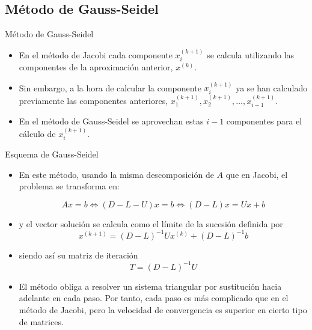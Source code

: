\documentclass[10pt]{beamer}
\begin{document}
  \subsection{M\'etodo de Gauss-Seidel}
  \begin{frame}{M\'etodo de Gauss-Seidel}
  \begin{itemize}
    \item<1-> En el m\'etodo de Jacobi cada componente $x_i^{(k+1)}$ se calcula utilizando las componentes de la aproximaci\'on anterior, $x^{(k)}$.
 \item<2-> Sin embargo, a la hora de calcular la componente $x_i^{(k+1)}$ ya se han calculado previamente las componentes anteriores, $x_1^{(k+1)}, x_2^{(k+1)},\ldots, x_{i-1}^{(k+1)}$.
 \item<3-> En el m\'etodo de Gauss-Seidel se aprovechan estas $i-1$ componentes para el c\'alculo de $x_i^{(k+1)}$.
 \end{itemize}
  \end{frame}
  \begin{frame}{Esquema de Gauss-Seidel}
  \begin{itemize}
    \item<1-> En este m\'etodo, usando la misma descomposici\'on de $A$ que en Jacobi, el problema se transforma en:

    $$
    Ax = b \Leftrightarrow (D - L -U)x = b \Leftrightarrow (D - L) x =Ux + b
    $$
    
    \item<2->y el vector soluci\'on se calcula como el l\'imite de la sucesi\'on definida por    
    $$
    x^{(k+1)} = (D-L)^{-1}Ux^{(k)}+(D-L)^{-1}b
    $$
    
    \item<3-> siendo as\'i su matriz de iteraci\'on    
    $$
    T = (D-L)^{-1}U
    $$
    \item<4->El m\'etodo obliga a resolver un sistema triangular por sustituci\'on hacia adelante en cada paso. Por tanto, cada paso es m\'as complicado que en el m\'etodo de Jacobi, pero la velocidad de convergencia es superior en cierto tipo de matrices.
  \end{itemize}
  \end{frame}
\end{document}
